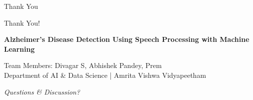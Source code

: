 \documentclass[aspectratio=169]{beamer}
\begin{document}
\begin{frame}{Thank You}
    \begin{center}
        \Huge{\textcolor{AmritaBlue}{Thank You!}}
        
        \vspace{0.5cm}
        \Large{\textbf{Alzheimer's Disease Detection Using Speech Processing with Machine Learning}}
        
        \vspace{0.5cm}
        \normalsize{Team Members: Divagar S, Abhishek Pandey, Prem} \\
        \small{Department of AI \& Data Science | Amrita Vishwa Vidyapeetham}
        
        \vspace{0.8cm}
        \textit{\Large Questions \& Discussion?}
    \end{center}
\end{frame}
\end{document}

